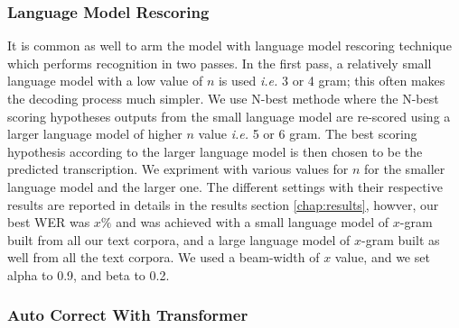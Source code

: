 \subsubsection{Language Model Rescoring}

It is common as well to arm the model with language model rescoring technique which performs recognition in two passes. In the first pass, a relatively small language model with a low value of $n$ is used \textit{i.e.} 3 or 4 gram; this often makes the decoding process much simpler. We use N-best methode where the N-best scoring hypotheses outputs from the small language model are re-scored using a larger language model of higher $n$ value \textit{i.e.} 5 or 6 gram. The best scoring hypothesis according to the larger language model is then chosen to be the predicted transcription.
We expriment with various values for $n$ for the smaller language model and the larger one. The different settings with their respective results are reported in details in the results section \ref{chap:results}, howver, our best \ac{WER} was $x \%$ and was achieved with a small language model of $x$-gram built from all our text corpora, and a large language model of $x$-gram built as well from all the text corpora. We used a beam-width of $x$ value, and we set alpha to 0.9, and beta to 0.2.


\subsubsection{Auto Correct With Transformer}


